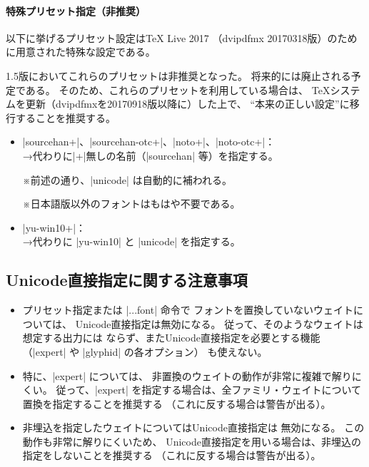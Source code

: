 \documentclass[uplatex,dvipdfmx,a4paper]{jsarticle}
\newcommand{\Note}{\par\noindent ※}
\providecommand{\Strong}[1]{\textsf{#1}}
\begin{document}
\paragraph{特殊プリセット指定\<（非推奨）}

以下に挙げるプリセット設定は{\TeX} Live 2017%
（dvipdfmx 20170318版）のために用意された特殊な設定である。

1.5版においてこれらのプリセットは\Strong{非推奨}となった。
将来的には廃止される予定である。
そのため、これらのプリセットを利用している場合は、
\Strong{{\TeX}システムを更新}（dvipdfmxを20170918版以降に）した上で、
“本来の正しい設定”に移行することを推奨する。

\begin{itemize}
\item |sourcehan+|、|sourcehan-otc+|、|noto+|、|noto-otc+|：\\
  →代わりに|+|無しの名前（|sourcehan| 等）を指定する。
  \Note 前述の通り、|unicode| は自動的に補われる。
  \Note 日本語版以外のフォントはもはや不要である。

\item |yu-win10+|：\\
  →代わりに |yu-win10| と |unicode| を指定する。
\end{itemize}

\subsection{Unicode直接指定に関する注意事項}
\label{ssec:DirectUnicodeNotice}

\begin{itemize}
\item プリセット指定または |\set...font| 命令で
  フォントを置換していないウェイトについては、
  Unicode直接指定は無効になる。
  従って、そのようなウェイトは想定する出力には
  ならず、またUnicode直接指定を必要とする機能
  （|expert| や |glyphid| の各オプション）
  も使えない。
\item 特に、|expert| については、
  非置換のウェイトの動作が非常に複雑で解りにくい。
  従って、|expert| を指定する場合は、全ファミリ・ウェイトについて
  置換を指定することを推奨する
  （これに反する場合は警告が出る）。
\item 非埋込を指定したウェイトについてはUnicode直接指定は
  無効になる。
  この動作も非常に解りにくいため、
  Unicode直接指定を用いる場合は、非埋込の指定をしないことを推奨する
  （これに反する場合は警告が出る）。
\end{itemize}
\end{document}
